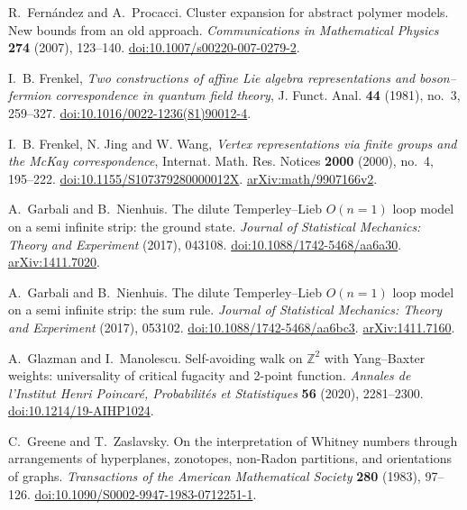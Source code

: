 R.~Fern\'andez and A.~Procacci.
Cluster expansion for abstract polymer models. New bounds from an old approach.
\emph{Communications in Mathematical Physics} \textbf{274} (2007), 123--140.
\href{https://doi.org/10.1007/s00220-007-0279-2}{doi:10.1007/s00220-007-0279-2}.

I.~B. Frenkel,
\emph{Two constructions of affine Lie algebra representations and
boson--fermion correspondence in quantum field theory},
J. Funct. Anal. \textbf{44} (1981), no.~3, 259--327.
\href{https://doi.org/10.1016/0022-1236(81)90012-4}{doi:10.1016/0022-1236(81)90012-4}.

I.~B. Frenkel, N. Jing and W. Wang,
\emph{Vertex representations via finite groups and the McKay correspondence},
Internat. Math. Res. Notices \textbf{2000} (2000), no.~4, 195--222.
\href{https://doi.org/10.1155/S107379280000012X}{doi:10.1155/S107379280000012X}.
\href{https://arxiv.org/abs/math/9907166v2}{arXiv:math/9907166v2}.

A.~Garbali and B.~Nienhuis.
The dilute Temperley--Lieb $O(n=1)$ loop model on a semi infinite strip:
the ground state.
\emph{Journal of Statistical Mechanics: Theory and Experiment} (2017), 043108.
\href{https://doi.org/10.1088/1742-5468/aa6a30}{doi:10.1088/1742-5468/aa6a30}.
\href{https://arxiv.org/abs/1411.7020}{arXiv:1411.7020}.

A.~Garbali and B.~Nienhuis.
The dilute Temperley--Lieb $O(n=1)$ loop model on a semi infinite strip:
the sum rule.
\emph{Journal of Statistical Mechanics: Theory and Experiment} (2017), 053102.
\href{https://doi.org/10.1088/1742-5468/aa6bc3}{doi:10.1088/1742-5468/aa6bc3}.
\href{https://arxiv.org/abs/1411.7160}{arXiv:1411.7160}.

A.~Glazman and I.~Manolescu.
Self-avoiding walk on $\mathbb Z^2$ with Yang--Baxter weights:
universality of critical fugacity and 2-point function.
\emph{Annales de l'Institut Henri Poincar\'e, Probabilit\'es et Statistiques}
\textbf{56} (2020), 2281--2300.
\href{https://doi.org/10.1214/19-AIHP1024}{doi:10.1214/19-AIHP1024}.

C.~Greene and T.~Zaslavsky.
On the interpretation of Whitney numbers through arrangements of hyperplanes,
zonotopes, non-Radon partitions, and orientations of graphs.
\emph{Transactions of the American Mathematical Society} \textbf{280} (1983), 97--126.
\href{https://doi.org/10.1090/S0002-9947-1983-0712251-1}{doi:10.1090/S0002-9947-1983-0712251-1}.

